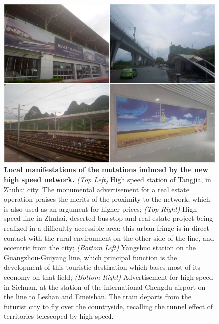 \documentclass[11pt]{article}
\begin{document}
\begin{figure}
	\includegraphics[width=\linewidth]{1-3-1-fig-qualitative-hsr}
	\caption{\textbf{Local manifestations of the mutations induced by the new high speed network.} \textit{(Top Left)} High speed station of Tangjia, in Zhuhai city. The monumental advertisement for a real estate operation praises the merits of the proximity to the network, which is also used as an argument for higher prices; \textit{(Top Right)} High speed line in Zhuhai, deserted bus stop and real estate project being realized in a difficultly accessible area: this urban fringe is in direct contact with the rural environment on the other side of the line, and eccentric from the city; \textit{(Bottom Left)} Yangshuo station on the Guangzhou-Guiyang line, which principal function is the development of this touristic destination which bases most of its economy on that field; \textit{(Bottom Right)} Advertisement for high speed in Sichuan, at the station of the international Chengdu airport on the line to Leshan and Emeishan. The train departs from the futurist city to fly over the countryside, recalling the tunnel effect of territories telescoped by high speed.\label{fig:qualitative:hsr}}
\end{figure}
\end{document}
